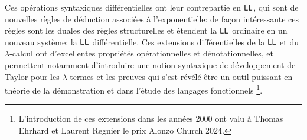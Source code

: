 \documentclass[a4]{article}
\begin{document}
Ces opérations syntaxiques différentielles ont leur contrepartie en
$\hbox{\textsf{LL}}$, qui sont de nouvelles règles de déduction associées à
l'exponentielle: de façon intéressante ces règles sont les duales des
règles structurelles et étendent la $\hbox{\textsf{LL}}$ ordinaire en un nouveau
système: la $\hbox{\textsf{LL}}$ différentielle.
%
Ces extensions différentielles de la $\hbox{\textsf{LL}}$ et du $\lambda$-calcul ont
d'excellentes propriétés opérationnelles et dénotationnelles, et
permettent notamment d'introduire une notion syntaxique de
développement de Taylor pour les $\lambda$-termes et les preuves qui
s'est révélé être un outil puissant en théorie de la démonstration et
dans l'étude des langages fonctionnels%
\footnote{L'introduction de ces extensions dans les années 2000 ont
  valu à Thomas Ehrhard et Laurent Regnier le prix Alonzo Church
  2024.}.



\end{document}
